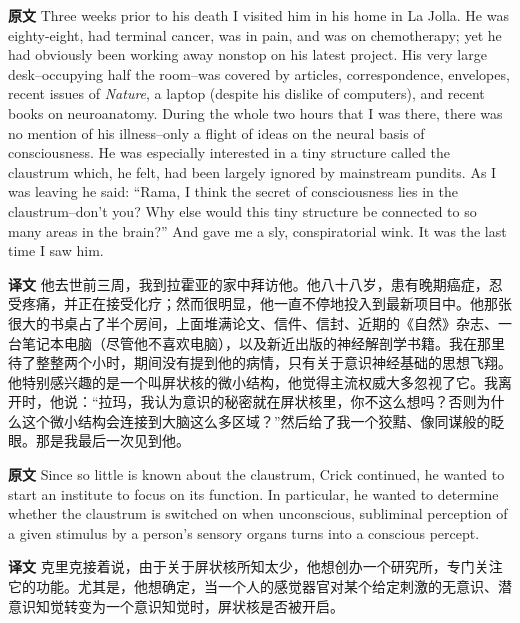 \documentclass[UTF8,zihao=-4]{ctexart}
\newcommand{\BodyFont}{\fontsize{10.5pt}{15.5pt}\selectfont}
\newcommand{\origlabel}{\textbf{原文}\quad}
\newcommand{\translabel}{\textbf{译文}\quad}
\newenvironment{enblock}{\par\noindent\begingroup\BodyFont\origlabel}{\par\endgroup}
\newenvironment{zhblock}{\par\noindent\begingroup\BodyFont\translabel}{\par\endgroup\vspace{0.35em}}
\begin{document}
\begin{enblock}
Three weeks prior to his death I visited him in his home in La Jolla. He was eighty-eight, had terminal cancer, was in pain, and was on chemotherapy; yet he had obviously been working away nonstop on his latest project. His very large desk--occupying half the room--was covered by articles, correspondence, envelopes, recent issues of \emph{Nature}, a laptop (despite his dislike of computers), and recent books on neuroanatomy. During the whole two hours that I was there, there was no mention of his illness--only a flight of ideas on the neural basis of consciousness. He was especially interested in a tiny structure called the claustrum which, he felt, had been largely ignored by mainstream pundits. As I was leaving he said: “Rama, I think the secret of consciousness lies in the claustrum--don't you? Why else would this tiny structure be connected to so many areas in the brain?” And gave me a sly, conspiratorial wink. It was the last time I saw him.
\end{enblock}
\begin{zhblock}
他去世前三周，我到拉霍亚的家中拜访他。他八十八岁，患有晚期癌症，忍受疼痛，并正在接受化疗；然而很明显，他一直不停地投入到最新项目中。他那张很大的书桌占了半个房间，上面堆满论文、信件、信封、近期的《自然》杂志、一台笔记本电脑（尽管他不喜欢电脑），以及新近出版的神经解剖学书籍。我在那里待了整整两个小时，期间没有提到他的病情，只有关于意识神经基础的思想飞翔。他特别感兴趣的是一个叫屏状核的微小结构，他觉得主流权威大多忽视了它。我离开时，他说：“拉玛，我认为意识的秘密就在屏状核里，你不这么想吗？否则为什么这个微小结构会连接到大脑这么多区域？”然后给了我一个狡黠、像同谋般的眨眼。那是我最后一次见到他。\end{zhblock}

\begin{enblock}
Since so little is known about the claustrum, Crick continued, he wanted to start an institute to focus on its function. In particular, he wanted to determine whether the claustrum is switched on when unconscious, subliminal perception of a given stimulus by a person's sensory organs turns into a conscious percept.
\end{enblock}
\begin{zhblock}
克里克接着说，由于关于屏状核所知太少，他想创办一个研究所，专门关注它的功能。尤其是，他想确定，当一个人的感觉器官对某个给定刺激的无意识、潜意识知觉转变为一个意识知觉时，屏状核是否被开启。\end{zhblock}
\end{document}

